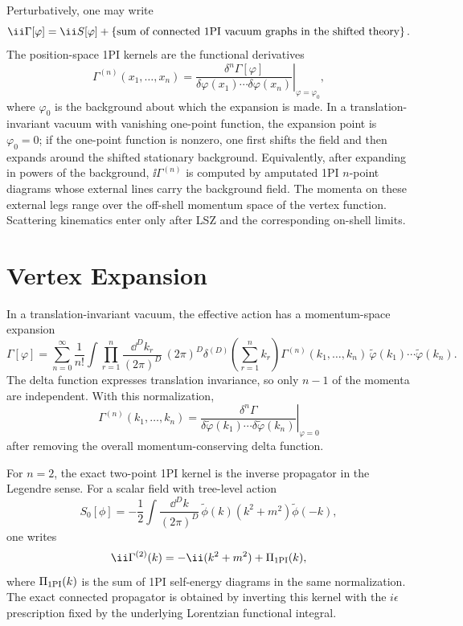 Perturbatively, one may write
\[
  \ii\Gamma[\varphi]
  =
  \ii S[\varphi]
  +
  \left\{
    \hbox{sum of connected 1PI vacuum graphs in the shifted theory}
  \right\}.
\]
The position-space 1PI kernels are the functional derivatives
\[
  \Gamma^{(n)}(x_1,\ldots,x_n)
  =
  \left.
  \frac{\delta^n\Gamma[\varphi]}
       {\delta\varphi(x_1)\cdots\delta\varphi(x_n)}
  \right|_{\varphi=\varphi_0},
\]
where \(\varphi_0\) is the background about which the expansion is made.  In a
translation-invariant vacuum with vanishing one-point function, the expansion
point is \(\varphi_0=0\); if the one-point function is nonzero, one first
shifts the field and then expands around the shifted stationary background.
Equivalently, after expanding in powers of the
background, \(\ii\Gamma^{(n)}\) is computed by amputated 1PI \(n\)-point
diagrams whose external lines carry the background field.  The momenta on
these external legs range over the off-shell momentum space of the vertex
function.  Scattering kinematics enter only after LSZ and the corresponding
on-shell limits.

\section{Vertex Expansion}

\begin{definition}
\label{def:momentum-space-1pi-vertices}
In a translation-invariant vacuum, the effective action has a momentum-space
expansion
\[
  \Gamma[\varphi]
  =
  \sum_{n=0}^{\infty}
  \frac1{n!}
  \int
  \prod_{r=1}^{n}
  \frac{\dd^Dk_r}{(2\pi)^D}\,
  (2\pi)^D\delta^{(D)}\!\left(\sum_{r=1}^{n}k_r\right)
  \Gamma^{(n)}(k_1,\ldots,k_n)\,
  \widetilde\varphi(k_1)\cdots\widetilde\varphi(k_n).
\]
The delta function expresses translation invariance, so only \(n-1\) of the
momenta are independent.  With this normalization,
\[
  \Gamma^{(n)}(k_1,\ldots,k_n)
  =
  \left.
  \frac{\delta^n\Gamma}
       {\delta\widetilde\varphi(k_1)\cdots
        \delta\widetilde\varphi(k_n)}
  \right|_{\varphi=0}
\]
after removing the overall momentum-conserving delta function.
\end{definition}

For \(n=2\), the exact two-point 1PI kernel is the inverse propagator in the
Legendre sense.  For a scalar field with tree-level action
\[
  S_0[\phi]
  =
  -\frac12
  \int \frac{\dd^Dk}{(2\pi)^D}\,
  \widetilde\phi(k)(k^2+m^2)\widetilde\phi(-k),
\]
one writes
\[
  \ii\Gamma^{(2)}(k)
  =
  -\ii(k^2+m^2)
  +
  \Pi_{\rm 1PI}(k),
\]
where \(\Pi_{\rm 1PI}(k)\) is the sum of 1PI self-energy diagrams in the same
normalization.  The exact connected propagator is obtained by inverting this
kernel with the \(i\epsilon\) prescription fixed by the underlying Lorentzian
functional integral.

